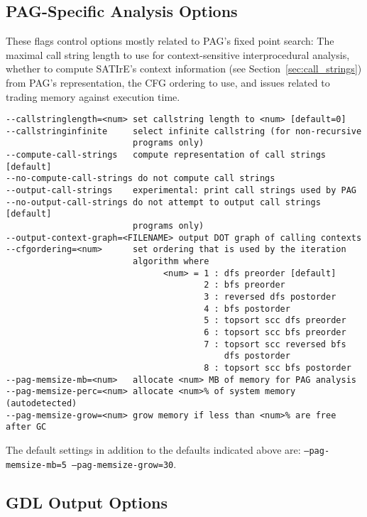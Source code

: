 \documentclass[a4paper,12pt]{report}
\begin{document}
\subsection{PAG-Specific Analysis Options}

These flags control options mostly related to PAG's fixed point search: The
maximal call string length to use for context-sensitive interprocedural
analysis, whether to compute SATIrE's context information (see
Section~\ref{sec:call_strings}) from PAG's representation, the CFG ordering
to use, and issues related to trading memory against execution time.

{\footnotesize
\begin{verbatim}
--callstringlength=<num> set callstring length to <num> [default=0]
--callstringinfinite     select infinite callstring (for non-recursive
                         programs only)
--compute-call-strings   compute representation of call strings [default]
--no-compute-call-strings do not compute call strings
--output-call-strings    experimental: print call strings used by PAG
--no-output-call-strings do not attempt to output call strings [default]
                         programs only)
--output-context-graph=<FILENAME> output DOT graph of calling contexts
--cfgordering=<num>      set ordering that is used by the iteration
                         algorithm where
                               <num> = 1 : dfs preorder [default]
                                       2 : bfs preorder
                                       3 : reversed dfs postorder
                                       4 : bfs postorder
                                       5 : topsort scc dfs preorder
                                       6 : topsort scc bfs preorder
                                       7 : topsort scc reversed bfs
                                           dfs postorder
                                       8 : topsort scc bfs postorder
--pag-memsize-mb=<num>   allocate <num> MB of memory for PAG analysis
--pag-memsize-perc=<num> allocate <num>% of system memory (autodetected)
--pag-memsize-grow=<num> grow memory if less than <num>% are free after GC
\end{verbatim}
}

The default settings in addition to the defaults indicated above are:
\texttt{--pag-memsize-mb=5 --pag-memsize-grow=30}.

\subsection{GDL Output Options}
\end{document}
